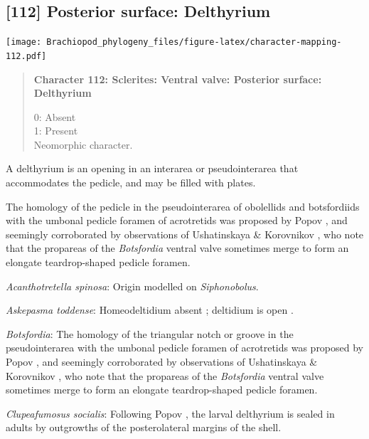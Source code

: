 \documentclass[openany]{book}
\begin{document}
\subsection*{{[}112{]} Posterior surface:
Delthyrium}\label{posterior-surface-delthyrium}

\texttt{[image: Brachiopod\_phylogeny\_files/figure-latex/character-mapping-112.pdf]}

\begin{quote}
\textbf{Character 112: Sclerites: Ventral valve: Posterior surface:
Delthyrium}

0: Absent\\
1: Present\\
Neomorphic character.
\end{quote}

A delthyrium is an opening in an interarea or pseudointerarea that
accommodates the pedicle, and may be filled with plates.

The homology of the pedicle in the pseudointerarea of obolellids and
botsfordiids with the umbonal pedicle foramen of acrotretids was
proposed by Popov \citeyearpar{Popov1992TheCambrian}, and seemingly
corroborated by observations of Ushatinskaya \& Korovnikov
\citeyearpar{Ushatinskaya2016Revisionof}, who note that the propareas of
the \emph{Botsfordia} ventral valve sometimes merge to form an elongate
teardrop-shaped pedicle foramen.

\hypertarget{Acanthotretella_spinosa-coding-112}{}
\emph{Acanthotretella spinosa}: Origin modelled on \emph{Siphonobolus}.

\hypertarget{Askepasma_toddense-coding-112}{}
\emph{Askepasma toddense}: Homeodeltidium absent
\citep[p.~153]{Williams2000LinguliformeaCraniiformea}; deltidium is open
\citep[see][fig. 4]{Topper2013Theoldest}.

\hypertarget{Botsfordia-coding-112}{}
\emph{Botsfordia}: The homology of the triangular notch or groove in the
pseudointerarea with the umbonal pedicle foramen of acrotretids was
proposed by Popov \citeyearpar{Popov1992TheCambrian}, and seemingly
corroborated by observations of Ushatinskaya \& Korovnikov
\citeyearpar{Ushatinskaya2016Revisionof}, who note that the propareas of
the \emph{Botsfordia} ventral valve sometimes merge to form an elongate
teardrop-shaped pedicle foramen.

\hypertarget{Clupeafumosus_socialis-coding-112}{}
\emph{Clupeafumosus socialis}: Following Popov
\citeyearpar{Popov1992TheCambrian}, the larval delthyrium is sealed in
adults by outgrowths of the posterolateral margins of the shell.
\end{document}
